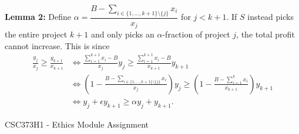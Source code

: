 \documentclass[11pt]{article}
\begin{document}
\textbf{Lemma 2:} Define $\alpha=\dfrac{B-\sum_{i\in\{1,\ldots,k+1\}\setminus\{j\}}x_i}{x_{j}}$ for $j<k+1$. If $S$ instead picks the entire project $k+1$ and only picks an $\alpha$-fraction of project $j$, the total profit cannot increase. This is since \begin{align*}
    \frac{y_j}{x_j}\geq\frac{y_{k+1}}{x_{k+1}} &\iff\frac{\sum_{i=1}^{k+1} x_i-B}{x_j}y_j\geq\frac{\sum_{i=1}^{k+1} x_i-B}{x_{k+1}}y_{k+1}\\
    &\iff (1-\frac{B-\sum_{i\in\{1,\ldots,k+1\}\setminus\{j\}} x_i}{x_j})y_j\geq(1-\frac{B-\sum_{i=1}^k x_i}{x_{k+1}})y_{k+1}\\
    &\iff y_j+\epsilon y_{k+1}\geq\alpha y_j+y_{k+1}.
\end{align*}

\begin{center}
{\Large CSC373H1 - Ethics Module Assignment}
\end{center}
\end{document}
